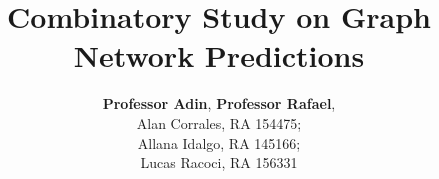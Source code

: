 \documentclass[11pt,a4paper]{article}
\begin{document}
\sloppy





\title{Combinatory Study on Graph Network Predictions}

\author{
    \normalsize
    \textbf{Professor Adin},
    \textbf{Professor Rafael},
    \normalsize
    \\
    \normalsize
    Alan Corrales, RA 154475; \\
    Allana Idalgo, RA 145166; \\
    Lucas  Racoci, RA 156331
}
\date{\vspace{-5ex}}
\maketitle


\vspace*{0.5cm}

\begin{spacing}{1.15}

\setcounter{page}{1}


\setcounter{page}{1}



\end{spacing}

{\small
\begin{singlespace}


\end{singlespace}
}
\end{document}
